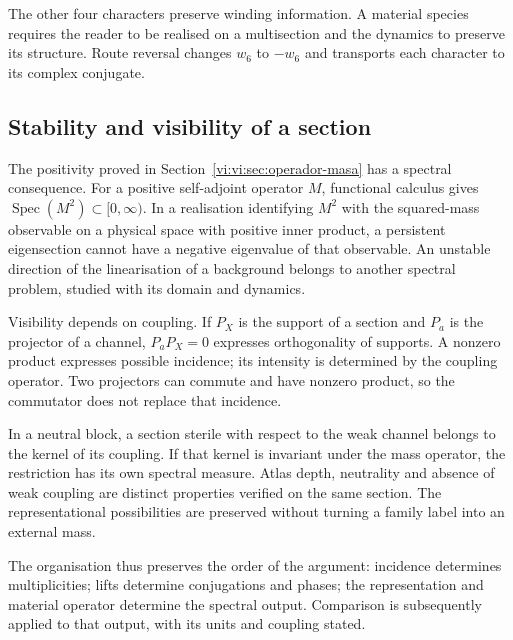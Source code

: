The other four characters preserve winding information.
A material species requires the reader to be realised on a
multisection and the dynamics to preserve its structure. Route
reversal changes $w_6$ to $-w_6$ and transports each character to its
complex conjugate.

\subsection{Stability and visibility of a section}

The positivity proved in
Section~\ref{vi:vi:sec:operador-masa} has a spectral consequence.
For a positive self-adjoint operator $M$, functional calculus gives
$\operatorname{Spec}(M^2)\subset[0,\infty)$. In a realisation
identifying $M^2$ with the squared-mass observable on a
physical space with positive inner product, a persistent eigensection
cannot have a negative eigenvalue of that observable. An unstable
direction of the linearisation of a background belongs to another spectral
problem, studied with its domain and dynamics.

Visibility depends on coupling. If $P_X$ is the support of a
section and $P_a$ is the projector of a channel, $P_aP_X=0$ expresses
orthogonality of supports. A nonzero product expresses possible
incidence; its intensity is determined by the coupling operator.
Two projectors can commute and have nonzero product, so
the commutator does not replace that incidence.

In a neutral block, a section sterile with respect to the weak channel
belongs to the kernel of its coupling. If that kernel is invariant
under the mass operator, the restriction has its own spectral
measure. Atlas depth, neutrality and absence of weak
coupling are distinct properties verified on the same
section. The representational possibilities are preserved without
turning a family label into an external mass.

The organisation thus preserves the order of the argument: incidence
determines multiplicities; lifts determine
conjugations and phases; the representation and material operator
determine the spectral output. Comparison is subsequently applied to
that output, with its units and coupling stated.
